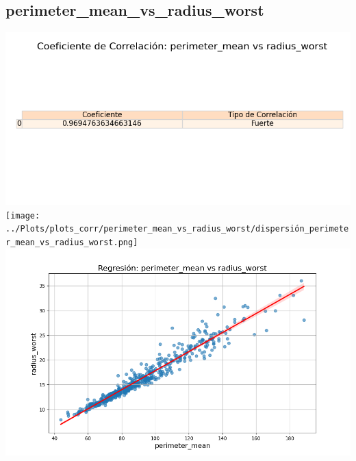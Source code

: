 \documentclass[a4paper, 12pt]{article}
\begin{document}
\subsection{perimeter\_mean\_vs\_radius\_worst}
    \includegraphics[width = \textwidth]{../Plots/plots_corr/perimeter_mean_vs_radius_worst/coeficiente_correlacion_perimeter_mean_vs_radius_worst.png}
    \texttt{[image: ../Plots/plots\_corr/perimeter\_mean\_vs\_radius\_worst/dispersión\_perimeter\_mean\_vs\_radius\_worst.png]}
    \includegraphics[width = \textwidth]{../Plots/plots_corr/perimeter_mean_vs_radius_worst/regresion_perimeter_mean_vs_radius_worst.png}
\end{document}
